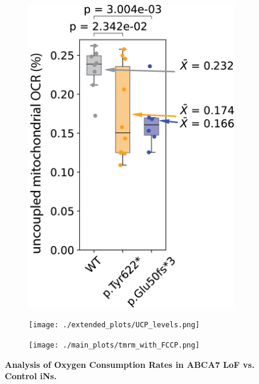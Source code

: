 \begin{figure}[H]
\begin{subfigure}[t]{0.25\textwidth}
    \end{subfigure} 
    \begin{subfigure}[t]{0.25\textwidth}
        \caption{}
        \includegraphics[width=\textwidth]{./extended_plots/uncoupling_quantification_batch2.png}        
    \end{subfigure} 
    \hspace{1cm}
    \begin{subfigure}[t]{0.4\textwidth}
        \caption{}
        \texttt{[image: ./extended\_plots/UCP\_levels.png]}        
    \end{subfigure} 
    \par
    \centering
    \begin{subfigure}[t]{0.65\textwidth}
        \caption{}
        \texttt{[image: ./main\_plots/tmrm\_with\_FCCP.png]}        
    \end{subfigure} 
    \caption{
         \textbf{Analysis of Oxygen Consumption Rates in ABCA7 LoF vs. Control iNs.}\\
     }
     \label{fig:oxygen_consumption_rates_iPSC_neurons}
 \end{figure}
